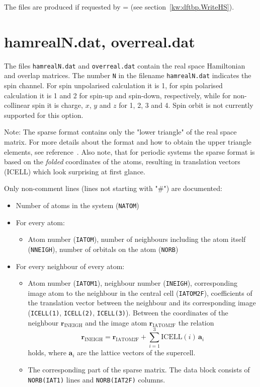 The files are produced if requested by  =  (see
section~\ref{kw:dftbp.WriteHS}).

\section{hamrealN.dat, overreal.dat}
\label{sec:hamreal}
 The files \verb|hamrealN.dat|
and \verb|overreal.dat| contain the real space Hamiltonian and overlap
matrices. The number \verb|N| in the filename \verb|hamrealN.dat|
indicates the spin channel. For spin unpolarised calculation it is 1,
for spin polarised calculation it is 1 and 2 for spin-up and
spin-down, respectively, while for non-collinear spin it is charge,
$x$, $y$ and $z$ for 1, 2, 3 and 4. Spin orbit is not currently
supported for this option.

Note: The sparse format contains only the "lower triangle" of the real
space matrix. For more details about the format and how to obtain the
upper triangle elements, see reference~\cite{dftbp-paper}. Also note,
that for periodic systems the sparse format is based on the
\emph{folded} coordinates of the atoms, resulting in translation
vectors (ICELL) which look surprising at first glance.

Only non-comment lines (lines not starting with "\#") are documented:
\begin{itemize}
\item Number of atoms in the system (\verb|NATOM|)
\item For every atom:
  \begin{itemize}
  \item Atom number (\verb|IATOM|), number of neighbours including the
    atom itself (\verb|NNEIGH|), number of orbitals on the atom
    (\verb|NORB|)
  \end{itemize}
\item For every neighbour of every atom:
  \begin{itemize}
  \item Atom number (\verb|IATOM1|), neighbour number (\verb|INEIGH|),
    corresponding image atom to the neighbour in the central cell
    (\verb|IATOM2F|), coefficients of the translation vector between
    the neighbour and its corresponding image (\verb|ICELL(1)|,
    \verb|ICELL(2)|, \verb|ICELL(3)|). Between the coordinates of the
    neighbour $\mathbf{r}_{\text{INEIGH}}$ and the image atom
    $\mathbf{r}_{\text{IATOM2F}}$ the relation
    \begin{equation*}
      \mathbf{r}_{\text{INEIGH}} = \mathbf{r}_{\text{IATOM2F}} + \sum_{i=1}^3
      \text{ICELL}(i)\, \mathbf{a}_i
    \end{equation*}
    holds, where $\mathbf{a}_i$ are the lattice vectors of the supercell.
  \item The corresponding part of the sparse matrix. The data block
    consists of \verb|NORB(IAT1)| lines and \verb|NORB(IAT2F)| columns.
  \end{itemize}
\end{itemize}

